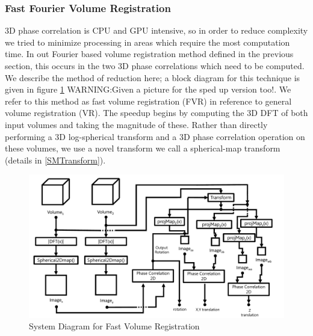 \subsubsection{Fast Fourier Volume Registration}

3D phase correlation is CPU and GPU intensive, so in order to reduce complexity we tried to minimize processing in areas which require the most computation time. In out Fourier based volume registration method defined in the previous section, this occurs in the two 3D phase correlations which need to be computed. We describe the method of reduction here; a block diagram for this technique is given in figure \ref{fig:PIPELINE3} WARNING:Given a picture for the sped up version too!. We refer to this method as fast volume registration (FVR) in reference to general volume registration (VR). The speedup begins by computing the 3D DFT of both input volumes and taking the magnitude of these. Rather than directly performing a 3D log-spherical transform and a 3D phase correlation operation on these volumes, we use a novel transform we call a spherical-map transform (details in \ref{SMTransform}).\\

\begin{figure}[t]
\centering
\includegraphics[width=6.0in]{images/ch2/pipeline3}
\caption{System Diagram for Fast Volume Registration}
\label{fig:PIPELINE3}
\end{figure}

